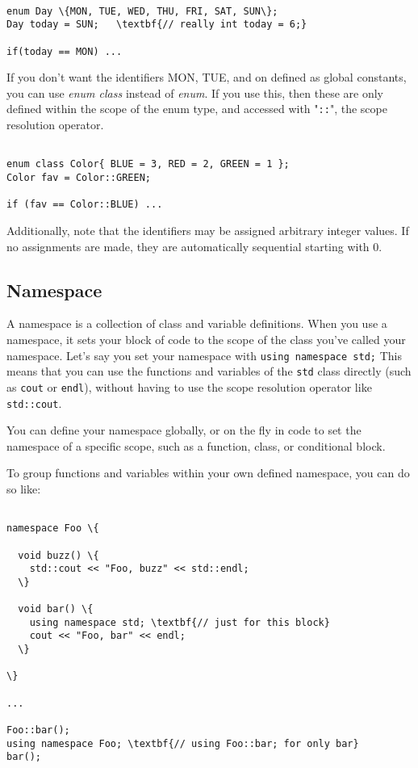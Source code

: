 \documentclass{IEEEtran}
\begin{document}
\begin{Verbatim}[fontsize=\scriptsize, xleftmargin=.3in, commandchars=\\\{\}]
          
enum Day \{MON, TUE, WED, THU, FRI, SAT, SUN\}; 
Day today = SUN;   \textbf{// really int today = 6;}

if(today == MON) ...
\end{Verbatim}

If you don't want the identifiers MON, TUE, and on defined as global constants, you can use \textit{enum class} instead of \textit{enum}. If you use this, then these are only defined within the scope of the enum type, and accessed with "\texttt{::}", the scope resolution operator.

\begin{Verbatim}[fontsize=\scriptsize, xleftmargin=.3in, commandchars=\\\{\}]
          
enum class Color{ BLUE = 3, RED = 2, GREEN = 1 };
Color fav = Color::GREEN;

if (fav == Color::BLUE) ...
\end{Verbatim}

Additionally, note that the identifiers may be assigned arbitrary integer values. If no assignments are made, they are automatically sequential starting with 0.

\subsection{Namespace}

A namespace is a collection of class and variable definitions. When you use a namespace, it sets your block of code to the scope of the class you've called your namespace. Let's say you set your namespace with \verb|using namespace std;| This means that you can use the functions and variables of the \verb|std| class directly (such as \verb|cout| or \verb|endl|), without having to use the scope resolution operator like \verb|std::cout|. 

You can define your namespace globally, or on the fly in code to set the namespace of a specific scope, such as a function, class, or conditional block.

To group functions and variables within your own defined namespace, you can do so like:

\begin{Verbatim}[fontsize=\scriptsize, xleftmargin=.3in, commandchars=\\\{\}]
          
namespace Foo \{

  void buzz() \{
    std::cout << "Foo, buzz" << std::endl;
  \}
  
  void bar() \{
    using namespace std; \textbf{// just for this block}
    cout << "Foo, bar" << endl;
  \}
  
\}

...

Foo::bar();
using namespace Foo; \textbf{// using Foo::bar; for only bar}
bar();

\end{Verbatim}
\end{document}
